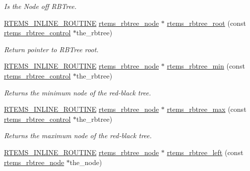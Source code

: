 \begin{DoxyCompactItemize}
\begin{DoxyCompactList}\small\item\em Is the Node off R\+B\+Tree. \end{DoxyCompactList}\item 
\mbox{\hyperlink{group__RTEMSScoreBaseDefs_gac216239df231d5dbd15e3520b0b9313f}{R\+T\+E\+M\+S\+\_\+\+I\+N\+L\+I\+N\+E\+\_\+\+R\+O\+U\+T\+I\+NE}} \mbox{\hyperlink{group__ClassicRBTrees_gaef47fc7fc61856c9afbf7f18a26ff80d}{rtems\+\_\+rbtree\+\_\+node}} $\ast$ \mbox{\hyperlink{group__ClassicRBTrees_ga1403efdb42c97e073824a6350f09ea6f}{rtems\+\_\+rbtree\+\_\+root}} (const \mbox{\hyperlink{group__ClassicRBTrees_ga21fe446d0b3cb8b25c814e93357753ef}{rtems\+\_\+rbtree\+\_\+control}} $\ast$the\+\_\+rbtree)
\begin{DoxyCompactList}\small\item\em Return pointer to R\+B\+Tree root. \end{DoxyCompactList}\item 
\mbox{\hyperlink{group__RTEMSScoreBaseDefs_gac216239df231d5dbd15e3520b0b9313f}{R\+T\+E\+M\+S\+\_\+\+I\+N\+L\+I\+N\+E\+\_\+\+R\+O\+U\+T\+I\+NE}} \mbox{\hyperlink{group__ClassicRBTrees_gaef47fc7fc61856c9afbf7f18a26ff80d}{rtems\+\_\+rbtree\+\_\+node}} $\ast$ \mbox{\hyperlink{group__ClassicRBTrees_gade1b71feee109e6818b952e74a0211e9}{rtems\+\_\+rbtree\+\_\+min}} (const \mbox{\hyperlink{group__ClassicRBTrees_ga21fe446d0b3cb8b25c814e93357753ef}{rtems\+\_\+rbtree\+\_\+control}} $\ast$the\+\_\+rbtree)
\begin{DoxyCompactList}\small\item\em Returns the minimum node of the red-\/black tree. \end{DoxyCompactList}\item 
\mbox{\hyperlink{group__RTEMSScoreBaseDefs_gac216239df231d5dbd15e3520b0b9313f}{R\+T\+E\+M\+S\+\_\+\+I\+N\+L\+I\+N\+E\+\_\+\+R\+O\+U\+T\+I\+NE}} \mbox{\hyperlink{group__ClassicRBTrees_gaef47fc7fc61856c9afbf7f18a26ff80d}{rtems\+\_\+rbtree\+\_\+node}} $\ast$ \mbox{\hyperlink{group__ClassicRBTrees_gad2f68e2923189451b5cda9223920d833}{rtems\+\_\+rbtree\+\_\+max}} (const \mbox{\hyperlink{group__ClassicRBTrees_ga21fe446d0b3cb8b25c814e93357753ef}{rtems\+\_\+rbtree\+\_\+control}} $\ast$the\+\_\+rbtree)
\begin{DoxyCompactList}\small\item\em Returns the maximum node of the red-\/black tree. \end{DoxyCompactList}\item 
\mbox{\hyperlink{group__RTEMSScoreBaseDefs_gac216239df231d5dbd15e3520b0b9313f}{R\+T\+E\+M\+S\+\_\+\+I\+N\+L\+I\+N\+E\+\_\+\+R\+O\+U\+T\+I\+NE}} \mbox{\hyperlink{group__ClassicRBTrees_gaef47fc7fc61856c9afbf7f18a26ff80d}{rtems\+\_\+rbtree\+\_\+node}} $\ast$ \mbox{\hyperlink{group__ClassicRBTrees_gaf019459bb8dfb8ff67c0361cf1f75e0c}{rtems\+\_\+rbtree\+\_\+left}} (const \mbox{\hyperlink{group__ClassicRBTrees_gaef47fc7fc61856c9afbf7f18a26ff80d}{rtems\+\_\+rbtree\+\_\+node}} $\ast$the\+\_\+node)

\end{DoxyCompactItemize}
